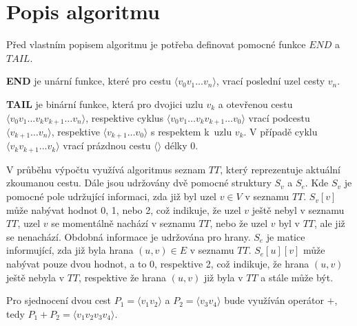     \section{Popis algoritmu}
        Před vlastním popisem algoritmu je potřeba definovat pomocné funkce $\mathit{END}$ a $\mathit{TAIL}$.

        \begin{definition}
            \label{def:end}
            \textbf{END} je unární funkce, které pro cestu $\langle v_0 v_1 \dots v_n \rangle$, vrací poslední uzel cesty $v_n$.
        \end{definition}

        \begin{definition}
            \textbf{TAIL} je binární funkce, která pro dvojici uzlu $v_k$ a otevřenou cestu $\langle v_0 v_1 \dots v_k v_{k+1} \dots v_n \rangle$, respektive cyklus $\langle v_0 v_1 \dots v_k v_{k+1} \dots v_0 \rangle$ vrací podcestu $\langle v_{k+1} \dots v_n \rangle$, respektive $\langle v_{k+1} \dots v_0 \rangle$ s respektem k~uzlu $v_k$. V případě cyklu $\langle v_k v_{k+1} \dots v_k \rangle$ vrací prázdnou cestu $\langle \rangle$ délky 0.
        \end{definition}

        \vspace*{1em}
        V průběhu výpočtu využívá algoritmus seznam $TT$, který reprezentuje aktuální zkoumanou cestu. Dále jsou udržovány dvě pomocné struktury $S_v$ a $S_e$. Kde $S_v$ je pomocné pole udržující informaci, zda již byl uzel $v \in V$ v seznamu $TT$. $S_v[v]$ může nabývat hodnot 0, 1, nebo 2, což indikuje, že uzel $v$ ještě nebyl v seznamu $TT$, uzel $v$ se momentálně nachází v seznamu $TT$, nebo že uzel $v$ byl v $TT$, ale již se nenachází. Obdobná informace je udržována pro hrany. $S_e$ je matice informující, zda již byla hrana $(u, v) \in E$ v seznamu $TT$. $S_e[u][v]$ může nabývat pouze dvou hodnot, a to 0, respektive 2, což indikuje, že hrana $(u, v)$ ještě nebyla v $TT$, respektive že hrana $(u, v)$ již byla v $TT$ a stále může být.

        Pro sjednocení dvou cest $P_1 = \langle v_1v_2 \rangle$ a $P_2 = \langle v_3v_4 \rangle$ bude využíván operátor $+$, tedy $P_1 + P_2 = \langle v_1v_2v_3v_4 \rangle$.


